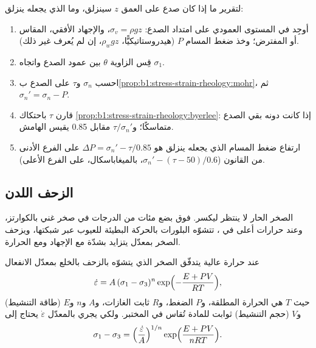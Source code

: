 \begin{method}\label{met:b1:stress-strain-rheology:slip-test}
لتقرير ما إذا كان صدع على العمق $z$ سينزلق، وما الذي يجعله ينزلق:
\begin{enumerate}
  \item أوجِد  في المستوى العمودي على امتداد الصدع: $\sigma_v = \rho g z$، والإجهاد الأفقي، المقاس أو المفترض؛ وخذ ضغط المسام $P$ (هيدروستاتيكيًّا، $\rho_w g z$، إن لم يُعرف غير ذلك).
  \item قِس الزاوية $\theta$ بين عمود الصدع واتجاه $\sigma_1$.
  \item احسب $\sigma_n$ و$\tau$ على الصدع ب\cref{prop:b1:stress-strain-rheology:mohr}، ثم $\sigma_n' = \sigma_n - P$.
  \item قارن $\tau$ باحتكاك \cref{prop:b1:stress-strain-rheology:byerlee}: إذا كانت دونه بقي الصدع متماسكًا؛ و$\tau/\sigma_n'$ مقابل 0.85 يقيس الهامش.
  \item ارتفاع ضغط المسام الذي يجعله ينزلق هو $\Delta P = \sigma_n' - \tau/0.85$ على الفرع الأدنى من القانون ($\sigma_n' - (\tau - 50)/0.6$، بالميغاباسكال، على الفرع الأعلى).
\end{enumerate}
\end{method}

\subsection*{الزحف اللدن}

الصخر الحار لا ينتظر ليكسر. فوق بضع مئات من الدرجات في صخر غني بالكوارتز، وعند حرارات أعلى في ، تتشوّه البلورات بالحركة البطيئة للعيوب عبر شبكتها، ويزحف الصخر بمعدّل يتزايد بشدّة مع الإجهاد ومع الحرارة.

\begin{proposition}\label{prop:b1:stress-strain-rheology:creep}
عند حرارة عالية يتدفّق الصخر الذي يتشوّه بالزحف بالخلع بمعدّل الانفعال
\[
  \dot\varepsilon = A\,(\sigma_1 - \sigma_3)^n \exp\Bigl(-\frac{E + PV}{RT}\Bigr),
\]
حيث $T$ هي الحرارة المطلقة، و$P$ الضغط، و$R$ ثابت الغازات، و$A$ و$n$ و$E$ (طاقة التنشيط) و$V$ (حجم التنشيط) ثوابت للمادة تُقاس في المختبر. ولكي يجري بالمعدّل $\dot\varepsilon$ يحتاج إلى 
\[
  \sigma_1 - \sigma_3 = \Bigl(\frac{\dot\varepsilon}{A}\Bigr)^{1/n}
  \exp\Bigl(\frac{E + PV}{nRT}\Bigr).
\]
\end{proposition}
\admitted

